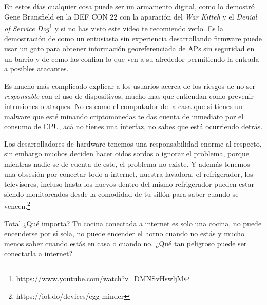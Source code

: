 \documentclass[11pt]{utalcaDoc}
\begin{document}
En estos días cualquier cosa puede ser un armamento digital, como lo demostró Gene Bransfield en la DEF CON 22 con la aparación del \textit{War Kitteh} y el  \textit{Denial of Service Dog}\footnote{https://www.youtube.com/watch?v=DMNSvHswljM} y si no has visto este video te recomiendo verlo. Es la demostración de como un entusiasta sin  experiencia desarrollando firmware puede usar un gato para obtener información georeferenciada de APs sin seguridad en un barrio y de como las confian lo que ven a su alrededor permitiendo la entrada a posibles atacantes.

Es mucho más complicado explicar a los usuarios acerca de los riesgos de no ser \textit{responsable} con el uso de dispositivos, mucho mas que entiendan como prevenir intrusiones o ataques. No es como el computador de la casa que si tienes un malware que esté minando criptomonedas te das cuenta de inmediato por el consumo de CPU, acá no tienes una interfaz, no sabes que está ocurriendo detrás.

Los desarrolladores de hardware tenemos una responsabilidad enorme al respecto, sin embargo muchos deciden hacer oidos sordos o ignorar el problema, porque mientras nadie se de cuenta de este, el problema no existe. Y además tenemos una obsesión por conectar todo a internet, nuestra lavadora, el refrigerador, los televisores, incluso hasta los huevos dentro del mismo refrigerador pueden estar siendo monitoreados desde la comodidad de tu sillón para saber cuando se vencen.\footnote{https://iot.do/devices/egg-minder}


Total ¿Qué importa? Tu cocina conectada a internet es solo una cocina, no puede encenderse por si sola, no puede encender el horno cuando no estás y mucho menos saber cuando estás en casa o cuando no. ¿Qué tan peligroso puede ser conectarla a internet?
\end{document}
